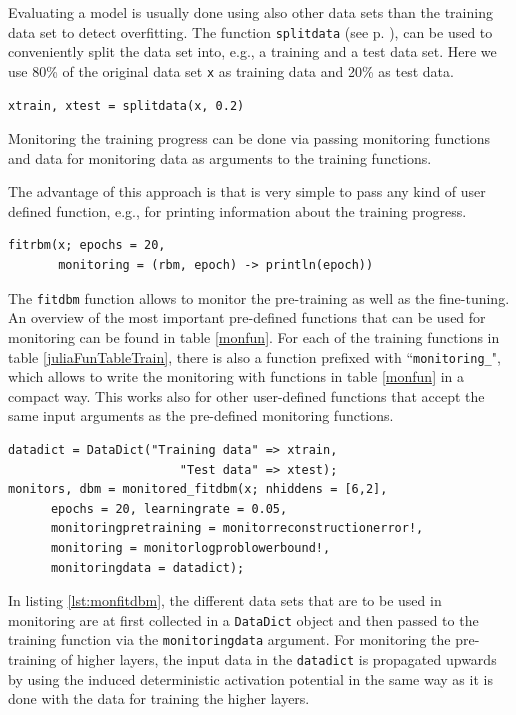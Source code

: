 \documentclass[12pt]{article}
\newcommand{\inlinecode}[1]{\texttt{#1}}
\begin{document}
Evaluating a model is usually done using also other data sets than the training data set to detect overfitting.
The function \inlinecode{splitdata} (see p. \pageref{bms_splitdata}), can be used to conveniently split the data set into, e.g., a training and a test data set.
Here we use 80\%  of the original data set \inlinecode{x} as training data and 20\% as test data.

\begin{lstlisting}
xtrain, xtest = splitdata(x, 0.2)
\end{lstlisting}

Monitoring the training progress can be done via passing monitoring functions and data for monitoring data as arguments to the training functions.

The advantage of this approach is that is very simple to pass any kind of user defined function, e.g., for printing information about the training progress.
\begin{lstlisting}
fitrbm(x; epochs = 20, 
       monitoring = (rbm, epoch) -> println(epoch))
\end{lstlisting}

The \inlinecode{fitdbm} function allows to monitor the pre-training as well as the fine-tuning.
An overview of the most important pre-defined functions that can be used for monitoring can be found in table \ref{monfun}.
For each of the training functions in table \ref{juliaFunTableTrain}, there is also a function prefixed with ``\inlinecode{monitoring\_}", which allows to write the monitoring with functions in table \ref{monfun} in a compact way.
This works also for other user-defined functions that accept the same input arguments as the pre-defined monitoring functions.

\begin{lstlisting}[caption={Monitoring pre-training and fine-tuning}, label={lst:monfitdbm}]
datadict = DataDict("Training data" => xtrain,
                        "Test data" => xtest);
monitors, dbm = monitored_fitdbm(x; nhiddens = [6,2],
      epochs = 20, learningrate = 0.05,
      monitoringpretraining = monitorreconstructionerror!,
      monitoring = monitorlogproblowerbound!,
      monitoringdata = datadict);
\end{lstlisting}

In listing \ref{lst:monfitdbm}, the different data sets that are to be used in monitoring are at first collected in a \inlinecode{DataDict} object and then passed to the training function via the  \inlinecode{monitoringdata} argument.
For monitoring the pre-training of higher layers, the input data in the \inlinecode{datadict} is propagated upwards by using the induced deterministic activation potential in the same way as it is done with the data for training the higher layers.
\end{document}
